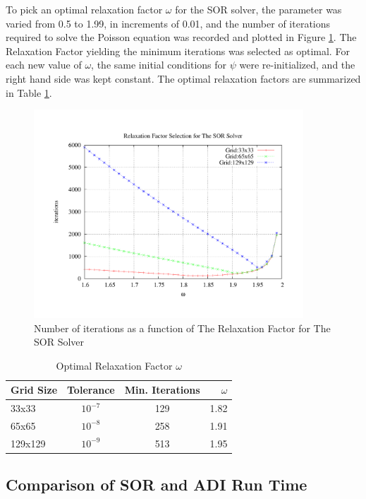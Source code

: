 To pick an optimal relaxation factor $\omega$ for the SOR solver, the parameter was varied from 0.5 to 1.99, in increments of 0.01, and the number of iterations required to solve the Poisson equation was recorded and plotted in Figure \ref{fig:rfs}. The Relaxation Factor yielding the minimum iterations was selected as optimal. For each new value of $\omega$, the same initial conditions for $\psi$ were re-initialized, and the right hand side was kept constant.  The optimal relaxation factors are summarized in Table \ref{tab:rfs}.


\begin{figure}[h!]
\center
\includegraphics[width=0.9\textwidth]{plots/rfs}
\caption{Number of iterations as a function of The Relaxation Factor for The SOR Solver}
\label{fig:rfs}
\end{figure}


\begin{table}
\center
\caption{Optimal Relaxation Factor $\omega$}
\label{tab:rfs}

\begin{tabular}{l c c r}
\hline
Grid Size & Tolerance & Min. Iterations & $\omega$  \\
\hline
\hline 
33x33   & $10^{-7}$ & 129 & 1.82 \\
65x65   & $10^{-8}$ & 258 & 1.91 \\
129x129 & $10^{-9}$ & 513 & 1.95 \\
\hline  
\end{tabular}
\end{table}



	\subsection{Comparison of SOR and ADI Run Time}
	\label{sec:sor_vs_adi}

